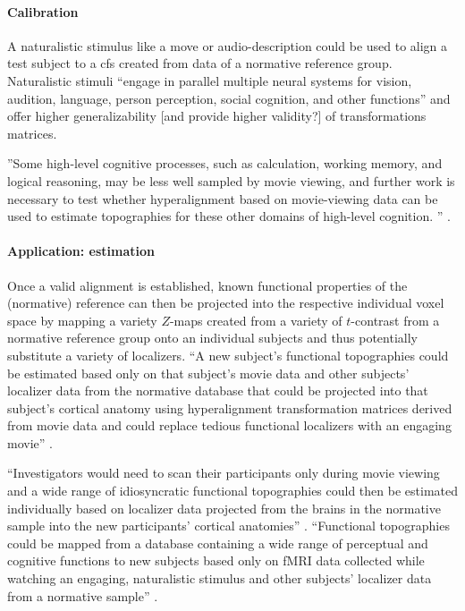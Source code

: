 \paragraph{Calibration}
%
A naturalistic stimulus like a move or audio-description could be used to align
a test subject to a \ac{cfs} created from data of a normative reference group.
%
Naturalistic stimuli ``engage in parallel multiple neural systems for vision,
audition, language, person perception, social cognition, and other functions''
\citep{jiahui2020predicting} and offer higher generalizability [and provide
higher validity?] of transformations matrices.

%
''Some high-level cognitive processes, such as calculation, working memory, and
logical reasoning, may be less well sampled by movie viewing, and further work
is necessary to test whether hyperalignment based on movie-viewing data can be
used to estimate topographies for these other domains of high-level cognition.
'' \citep{jiahui2020predicting}.


\paragraph{Application: estimation}

%
Once a valid alignment is established, known functional properties of the
(normative) reference can then be projected into the respective individual voxel
space by mapping a variety $Z$-maps created from a variety of $t$-contrast from
a normative reference group onto an individual subjects and thus potentially
substitute a variety of localizers.
%
``A new subject's functional topographies could be estimated based only on that
subject's movie data and other subjects' localizer data from the normative
database that could be projected into that subject's cortical anatomy using
hyperalignment transformation matrices derived from movie data and could replace
tedious functional localizers with an engaging movie''
\citep{jiahui2020predicting}.

%
``Investigators would need to scan their participants only during movie viewing
and a wide range of idiosyncratic functional topographies could then be
estimated individually based on localizer data projected from the brains in the
normative sample into the new participants' cortical anatomies''
\citep{jiahui2020predicting}.
%
``Functional topographies could be mapped from a database containing a wide
range of perceptual and cognitive functions to new subjects based only on fMRI
data collected while watching an engaging, naturalistic stimulus and other
subjects' localizer data from a normative sample'' \citep{jiahui2020predicting}.

